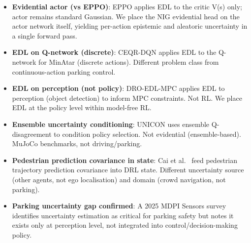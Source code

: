 \documentclass[11pt,a4paper]{article}
\begin{document}
\begin{itemize}[leftmargin=*]
  \item \textbf{Evidential actor (vs EPPO)}: EPPO \cite{akgul2025eppo} applies
        EDL to the critic V(s) only; actor remains standard Gaussian. We place
        the NIG evidential head on the actor network itself, yielding per-action
        epistemic and aleatoric uncertainty in a single forward pass.

  \item \textbf{EDL on Q-network (discrete)}: CEQR-DQN \cite{stutts2024ceqr}
        applies EDL to the Q-network for MinAtar (discrete actions). Different
        problem class from continuous-action parking control.

  \item \textbf{EDL on perception (not policy)}: DRO-EDL-MPC \cite{ham2025dro}
        applies EDL to perception (object detection) to inform MPC constraints.
        Not RL. We place EDL at the policy level within model-free RL.

  \item \textbf{Ensemble uncertainty conditioning}: UNICON \cite{yu2022unicon}
        uses ensemble Q-disagreement to condition policy selection. Not evidential
        (ensemble-based). MuJoCo benchmarks, not driving/parking.

  \item \textbf{Pedestrian prediction covariance in state}: Cai et al.\
        \cite{cai2024crowd} feed pedestrian trajectory prediction covariance
        into DRL state. Different uncertainty source (other agents, not ego
        localisation) and domain (crowd navigation, not parking).

  \item \textbf{Parking uncertainty gap confirmed}: A 2025 MDPI Sensors survey
        \cite{parking_survey2025} identifies uncertainty estimation as critical
        for parking safety but notes it exists only at perception level, not
        integrated into control/decision-making policy.
\end{itemize}



\end{document}
